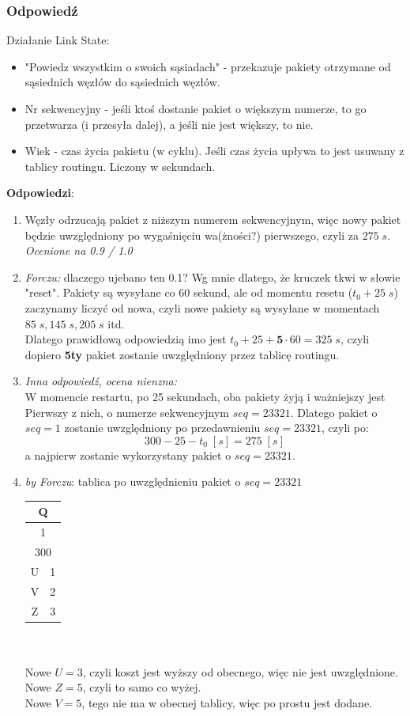 \documentclass[a4paper,twoside]{article}
\begin{document}
\subsubsection{Odpowiedź}
Działanie Link State:
\begin{itemize}
	\item "Powiedz wszystkim o swoich sąsiadach" - przekazuje pakiety otrzymane od sąsiednich węzłów do sąsiednich węzłów.
	\item Nr sekwencyjny - jeśli ktoś dostanie pakiet o większym numerze, to go przetwarza (i przesyła dalej), a jeśli nie jest większy, to nie.
	\item Wiek - czas życia pakietu (w cyklu). Jeśli czas życia upływa to jest usuwany z tablicy routingu. Liczony w sekundach.
\end{itemize}
\newpage
\textbf{Odpowiedzi}:
\begin{enumerate}
	\item Węzły odrzucają pakiet z niższym numerem sekwencyjnym, więc nowy pakiet będzie uwzględniony po wygaśnięciu wa(żności?) pierwszego, czyli za $ 275\;s $.\\
	\small{ \emph{Ocenione na 0.9 / 1.0}}
	\item \small{ \emph{Forczu:}} dlaczego ujebano ten 0.1? Wg mnie dlatego, że kruczek tkwi w słowie "reset". Pakiety są wysyłane co 60 sekund, ale od momentu resetu ($ t_0+25\;s $) zaczynamy liczyć od nowa, czyli nowe pakiety są wysyłane w momentach $ 85\;s, 145\;s, 205\;s $ itd.\\
	Dlatego prawidłową odpowiedzią imo jest $ t_0+25+\textbf{5}\cdot{60}=325\;s $, czyli dopiero \textbf{5ty} pakiet zostanie uwzględniony przez tablicę routingu.
	\item \small{ \emph{Inna odpowiedź, ocena nienzna:}}\\
	W momencie restartu, po 25 sekundach, oba pakiety żyją i ważniejszy jest Pierwszy z nich, o numerze sekwencyjnym $ seq=23321 $. Dlatego pakiet o $ seq=1 $ zostanie uwzględniony po przedawnieniu $ seq=23321 $, czyli po:
	$$ 300 - 25 - t_0\;[s]= 275\;[s] $$
	a najpierw zostanie wykorzystany pakiet o $ seq=23321 $.
	\item \emph{by Forczu}: tablica po uwzględnieniu pakiet o $ seq=23321 $ \\
	\begin{tabular}{|c|c|}
		\hline \multicolumn{2}{|c|}{Q}  \\ 
		\hline \multicolumn{2}{|c|}{1}  \\ 
		\hline \multicolumn{2}{|c|}{300}  \\ 
		\hline U & 1 \\
		\hline V & 2 \\
		\hline Z & 3 \\ 
		\hline 
	\end{tabular}\\\\
	Nowe $ U=3 $, czyli koszt jest wyższy od obecnego, więc nie jest uwzględnione.\\
	Nowe $ Z=5 $, czyli to samo co wyżej.\\
	Nowe $ V=5 $, tego nie ma w obecnej tablicy, więc po prostu jest dodane.
\end{enumerate}
\end{document}
